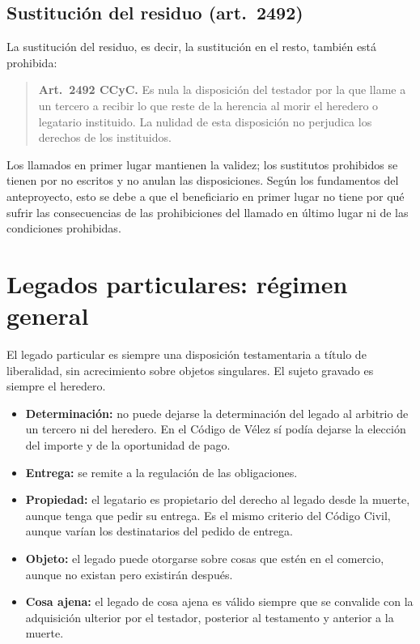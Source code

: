 \documentclass[12pt,oneside]{book}
\begin{document}
\subsection{Sustitución del residuo (art.~2492)}

La sustitución del residuo, es decir, la sustitución en el resto, también está prohibida:

\begin{quote}
\textbf{Art.~2492 CCyC.} Es nula la disposición del testador por la que llame a un tercero a recibir lo que reste de la herencia al morir el heredero o legatario instituido. La nulidad de esta disposición no perjudica los derechos de los instituidos.
\end{quote}

Los llamados en primer lugar mantienen la validez; los sustitutos prohibidos se tienen por no escritos y no anulan las disposiciones. Según los fundamentos del anteproyecto, esto se debe a que el beneficiario en primer lugar no tiene por qué sufrir las consecuencias de las prohibiciones del llamado en último lugar ni de las condiciones prohibidas.

\section{Legados particulares: régimen general}

El legado particular es siempre una disposición testamentaria a título de liberalidad, sin acrecimiento sobre objetos singulares. El sujeto gravado es siempre el heredero.

\begin{itemize}
    \item \textbf{Determinación:} no puede dejarse la determinación del legado al arbitrio de un tercero ni del heredero. En el Código de Vélez sí podía dejarse la elección del importe y de la oportunidad de pago.
    \item \textbf{Entrega:} se remite a la regulación de las obligaciones.
    \item \textbf{Propiedad:} el legatario es propietario del derecho al legado desde la muerte, aunque tenga que pedir su entrega. Es el mismo criterio del Código Civil, aunque varían los destinatarios del pedido de entrega.
    \item \textbf{Objeto:} el legado puede otorgarse sobre cosas que estén en el comercio, aunque no existan pero existirán después.
    \item \textbf{Cosa ajena:} el legado de cosa ajena es válido siempre que se convalide con la adquisición ulterior por el testador, posterior al testamento y anterior a la muerte.
\end{itemize}
\end{document}
